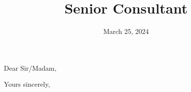 \documentclass[11pt,a4paper]{moderncv}
\title{Senior Consultant}
\begin{document}
\date{March 25, 2024}
\opening{Dear Sir/Madam,}
\closing{Yours sincerely,}



\end{document}
